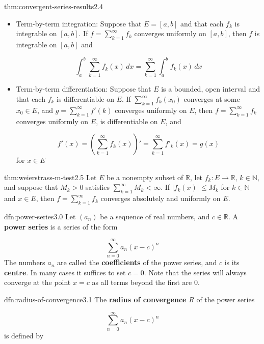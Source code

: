 \documentclass[landscape, 8pt]{extarticle}
\begin{document}
\begin{multicols}{3}
\begin{thm}{thm:convergent-series-results}{2.4}
\begin{itemize}
		\item Term-by-term integration: Suppose that $E=[a,b]$ and that each $f_{k}$ is integrable on $[a,b]$. If $f=\displaystyle\sum_{k=1}^{\infty} f_{k}$ converges uniformly on $[a,b]$, then $f$ is integrable on $[a,b]$ and

		\[\int_{a}^{b} \sum_{k=1}^{\infty} f_{k}(x) \, dx =\sum_{k=1}^{\infty} \int_{a}^{b} f_{k}(x) \, dx \]
		\item Term-by-term differentiation: Suppose that $E$ is a bounded, open interval and that each $f_{k}$ is differentiable on $E$. If $\sum_{k=1}^{\infty}f_{k}(x_{0})$ converges at some $x_{0}\in E$, and $g=\sum_{k=1}^{\infty}f'(k)$ converges uniformly on $E$, then $f= \sum_{k=1}^{\infty}f_{k}$ converges uniformly on $E$, is differentiable on $E$, and

		\[f'(x)=\left( \sum_{k=1}^{\infty} f_{k}(x) \right)'=\sum_{k=1}^{\infty} f'_{k}(x)=g(x)\]
		for $x\in E$

	\end{itemize}
\end{thm}

\begin{thm}{thm:weierstrass-m-test}{2.5}
	Let $E$ be a nonempty subset of $\mathbb{R}$, let $f_{k}: E\to \mathbb{R},\,k\in\mathbb{N}$, and suppose that $M_{k}>0$ satisfies $\displaystyle\sum_{k=1}^{\infty} M_{k}<\infty$. If $\lvert f_{k}(x) \rvert \le M_{k}$ for $k\in \mathbb{N}$ and $x\in E$,  then $f=\displaystyle\sum_{k=1}^{\infty}f_{k}$ converges absolutely and uniformly on $E$.
\end{thm}

\begin{dfn}{dfn:power-series}{3.0}
	Let $(a_{n})$ be a sequence of real numbers, and $c\in \mathbb{R}$. A \textbf{power series} is a series of the form

	\[\sum_{n=0}^{\infty} a_{n}(x-c)^{n}\]
	The numbers $a_{n}$ are called the \textbf{coefficients} of the power series, and $c$ is its \textbf{centre}. In many cases it suffices to set $c=0$. Note that the series will always converge at the point $x=c$ as all terms beyond the first are $0$.
\end{dfn}


\begin{dfn}{dfn:radius-of-convergence}{3.1}
	The \textbf{radius of convergence} $R$ of the power series

	\begin{equation}
		\sum_{n=0}^{\infty} a_{n}(x-c)^{n}\tag{$*$}\label{$*$}
	\end{equation}
	is defined by


\end{dfn}
\end{multicols}
\end{document}
